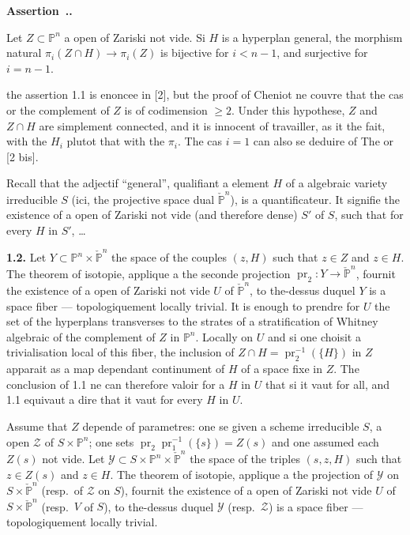 \documentclass[12pt,a4paper]{article}
\newcounter{secitem}
\renewcommand{\thesecitem}{\thesection.\arabic{secitem}}
\newenvironment{secassertion}{%
  \refstepcounter{secitem}%
  \par\medskip\noindent\textbf{Assertion~\thesecitem.}~\ignorespaces
}{\par\medskip}
\DeclareMathOperator{\pr}{pr}
\begin{document}
\begin{secassertion}
Let $Z \subset \mathbb{P}^n$ a open of Zariski not vide. Si $H$ is a hyperplan general, the morphism natural $\pi_i(Z \cap H) \to \pi_i(Z)$ is bijective for $i < n-1$, and surjective for $i = n-1$.
\end{secassertion}

the assertion 1.1 is enoncee in [2], but the proof of Cheniot ne couvre that the cas or the complement of $Z$ is of codimension $\geq 2$. Under this hypothese, $Z$ and $Z \cap H$ are simplement connected, and it is innocent of travailler, as it the fait, with the $H_i$ plutot that with the $\pi_i$. The cas $i = 1$ can also se deduire of The or [2 bis].

Recall that the adjectif ``general'', qualifiant a element $H$ of a algebraic variety irreducible $S$ (ici, the projective space dual $\check{\mathbb{P}}^n$), is a quantificateur. It signifie the existence of a open of Zariski not vide (and therefore dense) $S'$ of $S$, such that for every $H$ in $S'$, \ldots

\textbf{1.2.} Let $Y \subset \mathbb{P}^n \times \check{\mathbb{P}}^n$ the space of the couples $(z, H)$ such that $z \in Z$ and $z \in H$. The theorem of isotopie, applique a the seconde projection $\pr_2 : Y \to \check{\mathbb{P}}^n$, fournit the existence of a open of Zariski not vide $U$ of $\check{\mathbb{P}}^n$, to the-dessus duquel $Y$ is a space fiber --- topologiquement locally trivial. It is enough to prendre for $U$ the set of the hyperplans transverses to the strates of a stratification of Whitney algebraic of the complement of $Z$ in $\mathbb{P}^n$. Locally on $U$ and si one choisit a trivialisation local of this fiber, the inclusion of $Z \cap H = \pr_2^{-1}(\{H\})$ in $Z$ apparait as a map dependant continument of $H$ of a space fixe in $Z$. The conclusion of 1.1 ne can therefore valoir for a $H$ in $U$ that si it vaut for all, and 1.1 equivaut a dire that it vaut for every $H$ in $U$.

Assume that $Z$ depende of parametres: one se given a scheme irreducible $S$, a open $\mathcal{Z}$ of $S \times \mathbb{P}^n$; one sets $\pr_2\pr_1^{-1}(\{s\}) = Z(s)$ and one assumed each $Z(s)$ not vide. Let $\mathcal{Y} \subset S \times \mathbb{P}^n \times \check{\mathbb{P}}^n$ the space of the triples $(s, z, H)$ such that $z \in Z(s)$ and $z \in H$. The theorem of isotopie, applique a the projection of $\mathcal{Y}$ on $S \times \check{\mathbb{P}}^n$ (resp.\ of $\mathcal{Z}$ on $S$), fournit the existence of a open of Zariski not vide $U$ of $S \times \check{\mathbb{P}}^n$ (resp.\ $V$ of $S$), to the-dessus duquel $\mathcal{Y}$ (resp.\ $\mathcal{Z}$) is a space fiber --- topologiquement locally trivial.
\end{document}
